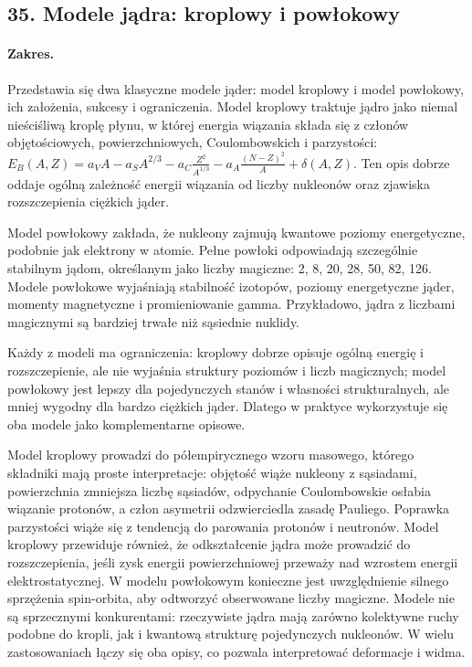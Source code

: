 \documentclass[11pt,a4paper]{article}
\begin{document}
\subsection{35. Modele jądra: kroplowy i powłokowy}
\paragraph{Zakres.} Przedstawia się dwa klasyczne modele jąder: model kroplowy i model powłokowy, ich założenia, sukcesy i ograniczenia. Model kroplowy traktuje jądro jako niemal nieściśliwą kroplę płynu, w której energia wiązania składa się z członów objętościowych, powierzchniowych, Coulombowskich i parzystości: $E_B(A,Z)=a_VA-a_SA^{2/3}-a_C\frac{Z^2}{A^{1/3}}-a_A\frac{(N-Z)^2}{A}+\delta(A,Z)$. Ten opis dobrze oddaje ogólną zależność energii wiązania od liczby nukleonów oraz zjawiska rozszczepienia ciężkich jąder.\par
Model powłokowy zakłada, że nukleony zajmują kwantowe poziomy energetyczne, podobnie jak elektrony w atomie. Pełne powłoki odpowiadają szczególnie stabilnym jądom, określanym jako liczby magiczne: 2, 8, 20, 28, 50, 82, 126. Modele powłokowe wyjaśniają stabilność izotopów, poziomy energetyczne jąder, momenty magnetyczne i promieniowanie gamma. Przykładowo, jądra z liczbami magicznymi są bardziej trwałe niż sąsiednie nuklidy.\par
Każdy z modeli ma ograniczenia: kroplowy dobrze opisuje ogólną energię i rozszczepienie, ale nie wyjaśnia struktury poziomów i liczb magicznych; model powłokowy jest lepszy dla pojedynczych stanów i własności strukturalnych, ale mniej wygodny dla bardzo ciężkich jąder. Dlatego w praktyce wykorzystuje się oba modele jako komplementarne opisowe.\par

Model kroplowy prowadzi do półempirycznego wzoru masowego, którego składniki mają proste interpretacje: objętość wiąże nukleony z sąsiadami, powierzchnia zmniejsza liczbę sąsiadów, odpychanie Coulombowskie osłabia wiązanie protonów, a człon asymetrii odzwierciedla zasadę Pauliego. Poprawka parzystości wiąże się z tendencją do parowania protonów i neutronów. Model kroplowy przewiduje również, że odkształcenie jądra może prowadzić do rozszczepienia, jeśli zysk energii powierzchniowej przeważy nad wzrostem energii elektrostatycznej. W modelu powłokowym konieczne jest uwzględnienie silnego sprzężenia spin-orbita, aby odtworzyć obserwowane liczby magiczne. Modele nie są sprzecznymi konkurentami: rzeczywiste jądra mają zarówno kolektywne ruchy podobne do kropli, jak i kwantową strukturę pojedynczych nukleonów. W wielu zastosowaniach łączy się oba opisy, co pozwala interpretować deformacje i widma.
\par
\end{document}
